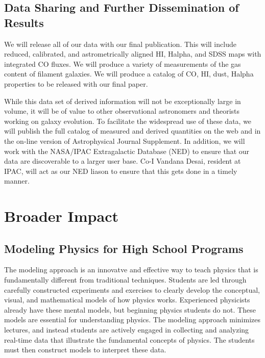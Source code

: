 \documentclass[11pt, preprint]{aastex}
\begin{document}
{%


\vspace*{-.8cm}\subsection{Data Sharing and Further Dissemination of Results }
\vspace*{-.3cm}

We will release all of our data with our final publication.  This will include 
reduced, calibrated, and astrometrically aligned HI,
Halpha, and SDSS maps with integrated CO fluxes.
We will produce a variety of measurements of the gas content of
filament galaxies.  We will produce a catalog of CO, HI, dust, Halpha
properties to be released with our final paper.

While this data set of derived information will not be exceptionally
large in volume, it will be of value to other observational
astronomers and theorists working on galaxy evolution. To facilitate
the widespread use of these data, we will publish the full catalog of
measured and derived quantities on the web and in the on-line version
of Astrophysical Journal Supplement. In addition, we will work with
the NASA/IPAC Extragalactic Database (NED) to ensure that our data are
discoverable to a larger user base. Co-I Vandana Desai, resident at
IPAC, will act as our NED liason to ensure that this gets done in a
timely manner.

\vspace*{-.7cm}
\section{Broader Impact}

\vspace*{-.4cm}
\subsection{Modeling Physics for High School Programs}
\vspace*{-.4cm}
The modeling
approach is an innovatve and effective way to teach physics that is 
fundamentally different from traditional techniques.  Students are led through
carefully constructed experiments and exercises to clearly develop the conceptual, 
visual, and mathematical models of how physics works.  
Experienced physicists already have these mental models, 
but beginning physics students do not.
These models are essential for understanding physics.
The modeling approach minimizes lectures, and instead 
students are actively engaged in collecting and analyzing real-time data
that illustrate the fundamental concepts of physics.   The students must
then construct models to interpret these
data.  

}
\end{document}
